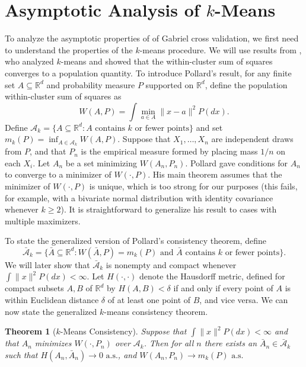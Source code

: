 \documentclass[11pt]{article}
\newtheorem{theorem}{Theorem}
\newcommand{\R}{\mathbb{R}}
\newcommand{\sA}{\mathcal{A}}
\newcommand{\sbA}{\mathcal{\bar A}}
\begin{document}
\clearpage

\section{Asymptotic Analysis of $k$-Means}

To analyze the asymptotic properties of of Gabriel cross validation, we first
need to understand the properties of the $k$-means procedure.  We will use
results from \citet{pollard1981strong}, who analyzed $k$-means and showed that
the within-cluster sum of squares converges to a population quantity.  To
introduce Pollard's result, for any finite set $A \subseteq \R^d$ and
probability measure $P$ supported on $\R^d$, define the population
within-cluster sum of squares as
\[
  W(A, P) = \int \min_{a \in A} \|x - a\|^2 P(dx).
\]
Define
\(
  \sA_k
    =
    \{ A \subseteq \R^d : \text{$A$ contains $k$ or fewer points} \}
\)
and set
\(
  m_k(P) = \inf_{A \in \sA_k}  W(A, P).
\)
Suppose that $X_1, \dotsc, X_n$ are independent draws from $P$, and that $P_n$
is the empirical measure formed by placing mass $1/n$ on each $X_i$.  Let
$A_n$ be a set minimizing $W(A_n, P_n)$.  Pollard gave conditions for $A_n$ to
converge to a minimizer of $W(\cdot, P)$.  His main theorem assumes that the
minimizer of $W(\cdot, P)$ is unique, which is too strong for our purposes
(this fails, for example, with a bivariate normal distribution with identity
covariance whenever $k \geq 2$).  It is straightforward to generalize his
result to cases with multiple maximizers.


To state the generalized version of Pollard's consistency theorem, define
\[
  \sbA_k = \{ \bar A \subseteq \R^d
            : W(\bar A, P) = m_k(P)
              \text{ and $\bar A$ contains $k$ or fewer points} \}.
\]
We will later show that $\sbA_k$ is nonempty and compact whenever $\int
\|x\|^2 P(dx) < \infty$.  Let $H(\cdot, \cdot)$ denote the Hausdorff metric,
defined for compact subsets $A, B$ of $\R^d$ by $H(A,B) < \delta$ if
and only if every point of $A$ is within Euclidean distance $\delta$ of at
least one point of $B$, and vice versa.  We can now state the generalized
$k$-means consistency theorem.


\begin{theorem}[$k$-Means Consistency]\label{lem:kmeans-consistency}
Suppose that $\int \|x\|^2 P(dx) < \infty$ and that $A_n$ minimizes $W(\cdot,
P_n)$ over $\sA_k$.  Then for all $n$ there exists an $\bar A_n \in \sbA_k$
such that $H(A_n, \bar A_n) \to 0\text{ a.s.}$, and $W(A_n, P_n) \to
m_k(P)\text{ a.s.}$ \end{theorem}
\end{document}
